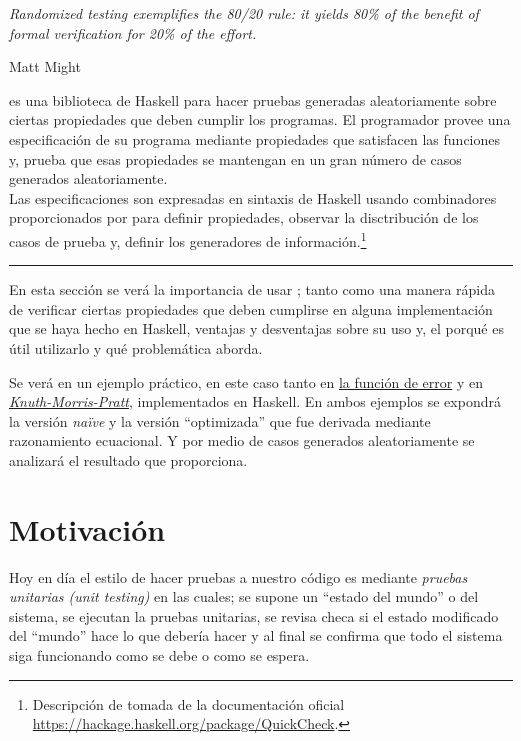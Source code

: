 \epigraph{\itshape Randomized testing exemplifies the 80/20 rule: it yields 80\% of the benefit
of formal verification for 20\% of the effort.}{Matt Might}

{\QuickCheck} es una biblioteca de Haskell para hacer pruebas generadas 
aleatoriamente sobre ciertas propiedades que deben cumplir los programas. El 
programador provee una especificación de su programa mediante propiedades 
que satisfacen las funciones  y, {\QuickCheck} prueba que esas propiedades se 
mantengan en un gran número de casos generados aleatoriamente.\\
Las especificaciones son expresadas en sintaxis de Haskell usando combinadores 
proporcionados por {\QuickCheck} 
para definir propiedades, observar la disctribución de los casos
de prueba y, definir los generadores de información.\footnote{
    Descripción de {\QuickCheck} tomada de la documentación oficial\\
    \url{https://hackage.haskell.org/package/QuickCheck}.
}

\noindent\rule{\textwidth}{1pt}
\hfill \break

En esta sección se verá la importancia de usar {\QuickCheck}; tanto como una 
manera rápida de verificar ciertas propiedades que deben cumplirse en alguna 
implementación que se haya hecho en Haskell, ventajas y desventajas sobre su 
uso y, el porqué es útil utilizarlo y qué problemática aborda.

Se verá en un ejemplo práctico, en este caso tanto en
\hyperlink{funcional:funcion_error}{la función de error} y en
\hyperlink{funcional:kmp}{\textit{Knuth-Morris-Pratt}}, implementados en 
Haskell. En ambos ejemplos se expondrá la versión \textit{naïve} y la versión 
``optimizada'' que fue derivada mediante razonamiento ecuacional. 
Y por medio de casos generados aleatoriamente se analizará el resultado que
{\QuickCheck} proporciona.


\section{Motivación}
Hoy en día el estilo de hacer pruebas a nuestro código es mediante 
\textit{pruebas unitarias (unit testing)} en las cuales; se supone un ``estado 
del mundo'' o del sistema, se ejecutan la pruebas unitarias, se revisa checa si 
el estado modificado del ``mundo'' hace lo que debería hacer y al final se 
confirma que todo el sistema siga funcionando como se debe o como se espera. 

